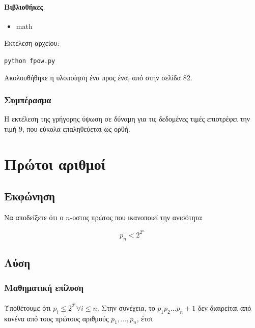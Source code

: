 \documentclass[oneside]{article}
\let\t\texttt
\begin{document}
\paragraph{Βιβλιοθήκες}

\begin{itemize}
    \item math
\end{itemize}

Εκτέλεση αρχείου:

\begin{center}
    \t{python fpow.py}
\end{center}

Ακολουθήθηκε η υλοποίηση ένα προς ένα, από \cite{draz:2022} στην σελίδα 82.

\subsubsection{Συμπέρασμα}

Η εκτέλεση της γρήγορης ύψωση σε δύναμη για τις δεδομένες τιμές επιστρέφει την τιμή $9$, που εύκολα επαληθεύεται ως ορθή.

\section{Πρώτοι αριθμοί}

\subsection{Εκφώνηση} 

Να αποδείξετε ότι ο $n$-οστος πρώτος που ικανοποιεί την ανισότητα 

\begin{equation}
    p_n < 2^{2^{n}}
\end{equation}

\subsection{Λύση} 

\subsubsection{Μαθηματική επίλυση}


Υποθέτουμε ότι $p_i \leq 2^{2^{i}}  \forall i \leq n$. Στην συνέχεια, το $p_1p_2...p_n + 1$ δεν διαιρείται από κανένα από τους πρώτους αριθμούς $p_1, ..., p_n$, έτσι
\end{document}
